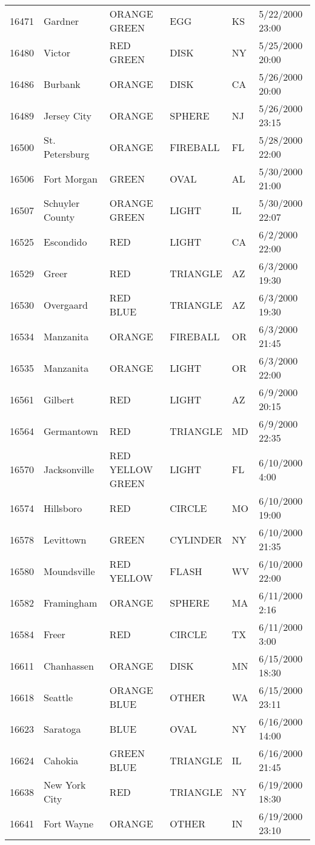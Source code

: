 \begin{tabular}{llllll}
16471 & Gardner & ORANGE GREEN & EGG & KS & 5/22/2000 23:00 \\
16480 & Victor & RED GREEN & DISK & NY & 5/25/2000 20:00 \\
16486 & Burbank & ORANGE & DISK & CA & 5/26/2000 20:00 \\
16489 & Jersey City & ORANGE & SPHERE & NJ & 5/26/2000 23:15 \\
16500 & St. Petersburg & ORANGE & FIREBALL & FL & 5/28/2000 22:00 \\
16506 & Fort Morgan & GREEN & OVAL & AL & 5/30/2000 21:00 \\
16507 & Schuyler County & ORANGE GREEN & LIGHT & IL & 5/30/2000 22:07 \\
16525 & Escondido & RED & LIGHT & CA & 6/2/2000 22:00 \\
16529 & Greer & RED & TRIANGLE & AZ & 6/3/2000 19:30 \\
16530 & Overgaard & RED BLUE & TRIANGLE & AZ & 6/3/2000 19:30 \\
16534 & Manzanita & ORANGE & FIREBALL & OR & 6/3/2000 21:45 \\
16535 & Manzanita & ORANGE & LIGHT & OR & 6/3/2000 22:00 \\
16561 & Gilbert & RED & LIGHT & AZ & 6/9/2000 20:15 \\
16564 & Germantown & RED & TRIANGLE & MD & 6/9/2000 22:35 \\
16570 & Jacksonville & RED YELLOW GREEN & LIGHT & FL & 6/10/2000 4:00 \\
16574 & Hillsboro & RED & CIRCLE & MO & 6/10/2000 19:00 \\
16578 & Levittown & GREEN & CYLINDER & NY & 6/10/2000 21:35 \\
16580 & Moundsville & RED YELLOW & FLASH & WV & 6/10/2000 22:00 \\
16582 & Framingham & ORANGE & SPHERE & MA & 6/11/2000 2:16 \\
16584 & Freer & RED & CIRCLE & TX & 6/11/2000 3:00 \\
16611 & Chanhassen & ORANGE & DISK & MN & 6/15/2000 18:30 \\
16618 & Seattle & ORANGE BLUE & OTHER & WA & 6/15/2000 23:11 \\
16623 & Saratoga & BLUE & OVAL & NY & 6/16/2000 14:00 \\
16624 & Cahokia & GREEN BLUE & TRIANGLE & IL & 6/16/2000 21:45 \\
16638 & New York City & RED & TRIANGLE & NY & 6/19/2000 18:30 \\
16641 & Fort Wayne & ORANGE & OTHER & IN & 6/19/2000 23:10 \\

\end{tabular}
